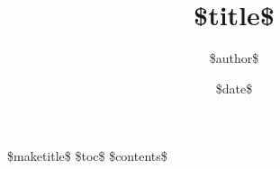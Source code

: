 \documentclass{article}
\begin{document}
\title{\$title\$} 
\author{\$author\$}
\date{\$date\$}

\$maketitle\$
\$toc\$
\$contents\$
\end{document}
